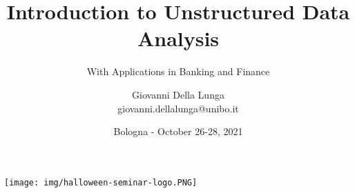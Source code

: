 \documentclass[11pt]{beamer}
\author{Giovanni Della Lunga\\{\footnotesize giovanni.dellalunga@unibo.it}}
\title{Introduction to Unstructured Data Analysis}
\subtitle{With Applications in Banking and Finance} %
\institute{Halloween Conference in Quantitative Finance}
\date{Bologna - October 26-28, 2021}
\begin{document}
\begin{frame}
\texttt{[image: img/halloween-seminar-logo.PNG]}
\end{frame}

\begin{frame}
\titlepage
\end{frame}

\AtBeginSubsection{\frame{\subsectionpage}}

%
\end{document}
